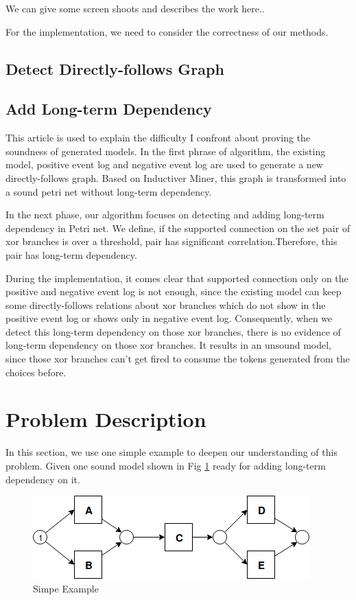 We can give some screen shoots and describes the work here..

For the implementation, we need to consider the correctness of our methods.
\subsection{Detect Directly-follows Graph}


\subsection{Add Long-term Dependency}
This article is used to explain the difficulty I confront about proving the soundness of generated models.
In the first phrase of algorithm, the existing model, positive event log and negative event log are used to generate a new directly-follows graph. Based on Inductiver Miner, this graph is transformed into a sound petri net without long-term dependency. 

In the next phase, our algorithm focuses on detecting and adding long-term dependency in Petri net. We define, if the supported connection on the set pair of xor branches is over a threshold, pair has significant correlation.Therefore, this pair has long-term dependency.

During the implementation, it comes clear that supported connection only on the positive and negative event log is not enough, since the existing model can keep some directly-follows relations about xor branches which do not show in the positive event log or shows only in negative event log. Consequently, when we detect this long-term dependency on those xor branches, there is no evidence of long-term dependency on those xor branches. It results in an unsound model, since those xor branches can't get fired to consume the tokens generated from the choices before.

\section{Problem Description}
In this section, we use one simple example to deepen our understanding of this problem. 
Given one sound model shown in Fig \ref{fig:seq-2-xor-model} ready for adding long-term dependency on it. 
\begin{figure}[!h]
	\includegraphics[width=\textwidth]{figures/implementation/LT_Seq_01_Original.png}
	\caption{Simpe Example}
	\label{fig:seq-2-xor-model}
\end{figure}

